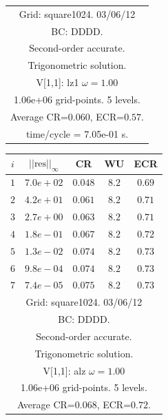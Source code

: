 \begin{table}[hbt]
\begin{center}
{\begin{tabular}{|c|c|c|c|c|}
\hline 
\multicolumn{5}{|c|}{Grid: square1024. 03/06/12}  \\
\multicolumn{5}{|c|}{BC: DDDD.}  \\
\multicolumn{5}{|c|}{Second-order accurate.}  \\
\multicolumn{5}{|c|}{Trigonometric solution.}  \\
\multicolumn{5}{|c|}{V[1,1]: lz1 $\omega=1.00$}  \\
\multicolumn{5}{|c|}{1.06e+06 grid-points. 5 levels.}  \\
\multicolumn{5}{|c|}{Average CR=$0.060$, ECR=$0.57$.}  \\
\multicolumn{5}{|c|}{time/cycle = 7.05e-01 s.}  \\
\hline 
\end{tabular}
\begin{tabular}{|c|c|c|c|c|} \hline 
 $i$   & $\vert\vert\mbox{res}\vert\vert_\infty$  &  CR     &  WU    & ECR  \\   \hline 
 $ 1$  & $ 7.0e+02$ & $0.048$ & $ 8.2$ & $0.69$ \\ 
 $ 2$  & $ 4.2e+01$ & $0.061$ & $ 8.2$ & $0.71$ \\ 
 $ 3$  & $ 2.7e+00$ & $0.063$ & $ 8.2$ & $0.71$ \\ 
 $ 4$  & $ 1.8e-01$ & $0.067$ & $ 8.2$ & $0.72$ \\ 
 $ 5$  & $ 1.3e-02$ & $0.074$ & $ 8.2$ & $0.73$ \\ 
 $ 6$  & $ 9.8e-04$ & $0.074$ & $ 8.2$ & $0.73$ \\ 
 $ 7$  & $ 7.4e-05$ & $0.075$ & $ 8.2$ & $0.73$ \\ 
\hline 
\multicolumn{5}{|c|}{Grid: square1024. 03/06/12}  \\
\multicolumn{5}{|c|}{BC: DDDD.}  \\
\multicolumn{5}{|c|}{Second-order accurate.}  \\
\multicolumn{5}{|c|}{Trigonometric solution.}  \\
\multicolumn{5}{|c|}{V[1,1]: alz $\omega=1.00$}  \\
\multicolumn{5}{|c|}{1.06e+06 grid-points. 5 levels.}  \\
\multicolumn{5}{|c|}{Average CR=$0.068$, ECR=$0.72$.}  \\

\end{tabular}}
\end{center}
\end{table}
